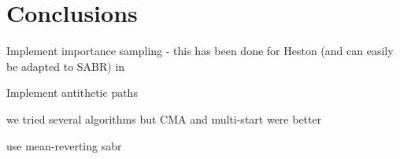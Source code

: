 
\chapter{Conclusions}
\label{chapter:conclusions}
Implement importance sampling - this has been done for Heston (and can easily be adapted to SABR) in \cite{Stilger}

Implement antithetic paths

we tried several algorithms but CMA and multi-start were better


use mean-reverting sabr
